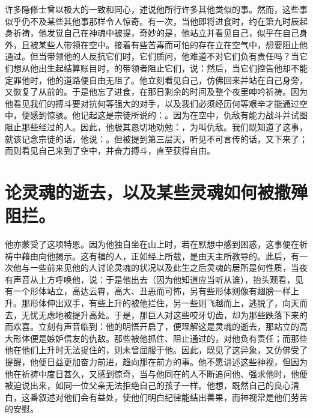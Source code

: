 许多隐修士曾以极大的一致和同心，述说他所行许多其他类似的事。然而，这些事似乎仍不及某些其他事那样令人惊奇。有一次，当他即将进食时，约在第九时辰起身祈祷，他发觉自己在神魂中被提，奇妙的是，他站立并看见自己，似乎在自己身外，且被某些人带领在空中。接着有些苦毒而可怕的存在立在空气中，想要阻止他通过。但当带领他的人反抗它们时，它们质问，他难道不对它们负有责任吗？当它们想从他出生起结算账目时，的带领者阻止它们，说：然后，当它们控告他却不能定罪他时，他的道路便自由无阻了。他立刻看见自己，仿佛回来并站在自己身旁，又恢复了从前的。于是他忘了进食，在那日剩余的时间及整个夜里呻吟祈祷。因为他看见我们的搏斗要对抗何等强大的对手，以及我们必须经历何等艰辛才能通过空中，便感到惊骇。他记起这是宗徒所说的：。因为在空中，仇敌有能力战斗并试图阻止那些经过的人。因此，他极其恳切地劝勉：，为叫仇敌。我们既知道了这事，就该记念宗徒的话，他说：。但被提到第三层天，听见不可言传的话，又下来了；而则看见自己来到了空中，并奋力搏斗，直至获得自由。\par


\section{论灵魂的逝去，以及某些灵魂如何被撒殚阻拦。}

他亦蒙受了这项特恩。因为他独自坐在山上时，若在默想中感到困惑，这事便在祈祷中藉由向他揭示。这有福的人，正如经上所载，是由天主所教导的。此后，有一次他与一些前来见他的人讨论灵魂的状况以及此生之后灵魂的居所是何性质，当夜有声音从上方呼唤他，说：于是他出去（因为他知道应当听从谁），抬头观看，见有一个形体站立，高达云霄，高大、丑恶而可怖，另有些形体则像有翅膀一样上升。那形体伸出双手，有些上升的被他拦住，另一些则飞越而上，逃脱了，向天而去，无忧无虑地被提升高处。于是，那巨人对这些咬牙切齿，却为那些跌落下来的而欢喜。立刻有声音临到：他的明悟开启了，便理解这是灵魂的逝去，那站立的高大形体便是嫉妒信友的仇敌。那些被他抓住、阻止通过的，对他负有责任；而那些他在他们上升时无法捉住的，则未曾屈服于他。因此，既见了这异象，又仿佛受了提醒，他便日益更加奋力前进，趋向那在前方的事。他不愿讲述这些神视，但因为他在祈祷中度日甚久，又感到惊奇，当与他同在的人不断追问他、强求他时，他便被迫说出来，如同一位父亲无法拒绝自己的孩子一样。他想，既然自己的良心清白，这番叙述对他们会有益处，使他们明白纪律能结出善果，而神视常是他们劳苦的安慰。\par


